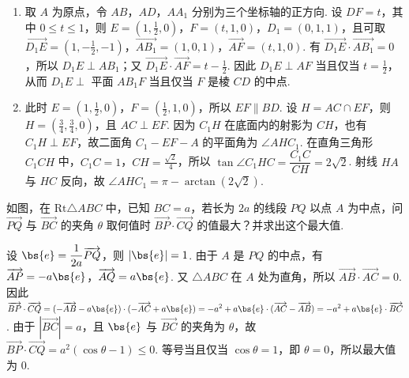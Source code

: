 \begin{solution}
\begin{enumerate}
\item 取 \(A\) 为原点，令 \(AB\)，\(AD\)，\(AA_1\) 分别为三个坐标轴的正方向. 设 \(DF=t\)，其中 \(0\leqslant t\leqslant1\)，则 \(E=(1,\frac12,0)\)，\(F=(t,1,0)\)，\(D_1=(0,1,1)\)，且可取 \(\overrightarrow{D_1E}=(1,-\frac12,-1)\)，\(\overrightarrow{AB_1}=(1,0,1)\)，\(\overrightarrow{AF}=(t,1,0)\). 有 \(\overrightarrow{D_1E}\cdot\overrightarrow{AB_1}=0\)，所以 \(D_1E\perp AB_1\)；又 \(\overrightarrow{D_1E}\cdot\overrightarrow{AF}=t-\frac12\). 因此 \(D_1E\perp AF\) 当且仅当 \(t=\frac12\)，从而 \(D_1E\perp\) 平面 \(AB_1F\) 当且仅当 \(F\) 是棱 \(CD\) 的中点.
\item 此时 \(E=(1,\frac12,0)\)，\(F=(\frac12,1,0)\)，所以 \(EF\parallel BD\). 设 \(H=AC\cap EF\)，则 \(H=(\frac34,\frac34,0)\)，且 \(AC\perp EF\). 因为 \(C_1H\) 在底面内的射影为 \(CH\)，也有 \(C_1H\perp EF\)，故二面角 \(C_1-EF-A\) 的平面角为 \(\angle AHC_1\). 在直角三角形 \(C_1CH\) 中，\(C_1C=1\)，\(CH=\frac{\sqrt2}{4}\)，所以 \(\tan\angle C_1HC=\dfrac{C_1C}{CH}=2\sqrt2\). 射线 \(HA\) 与 \(HC\) 反向，故 \(\angle AHC_1=\pi-\arctan(2\sqrt2)\).
\end{enumerate}
\end{solution}

\begin{problem}
如图，在 \(\mathrm{Rt}\triangle ABC\) 中，已知 \(BC = a\)，若长为 \(2a\) 的线段 \(PQ\) 以点 \(A\) 为中点，问 \(\overrightarrow{PQ}\) 与 \(\overrightarrow{BC}\) 的夹角 \(\theta\) 取何值时 \(\overrightarrow{BP} \cdot \overrightarrow{CQ}\) 的值最大？并求出这个最大值.

\FloatBarrier
\end{problem}

\begin{solution}
设 \(\bs{e}=\dfrac{1}{2a}\overrightarrow{PQ}\)，则 \(|\bs{e}|=1\). 由于 \(A\) 是 \(PQ\) 的中点，有 \(\overrightarrow{AP}=-a\bs{e}\)，\(\overrightarrow{AQ}=a\bs{e}\). 又 \(\triangle ABC\) 在 \(A\) 处为直角，所以 \(\overrightarrow{AB}\cdot\overrightarrow{AC}=0\). 因此
\(\displaystyle\overrightarrow{BP}\cdot\overrightarrow{CQ}=(-\overrightarrow{AB}-a\bs{e})\cdot(-\overrightarrow{AC}+a\bs{e})=-a^2+a\bs{e}\cdot(\overrightarrow{AC}-\overrightarrow{AB})=-a^2+a\bs{e}\cdot\overrightarrow{BC}\).
由于 \(|\overrightarrow{BC}|=a\)，且 \(\bs{e}\) 与 \(\overrightarrow{BC}\) 的夹角为 \(\theta\)，故 \(\overrightarrow{BP}\cdot\overrightarrow{CQ}=a^2(\cos\theta-1)\leqslant0\). 等号当且仅当 \(\cos\theta=1\)，即 \(\theta=0\)，所以最大值为 \(0\).
\end{solution}

